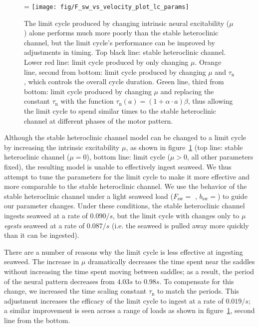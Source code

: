 \begin{figure}
    \ifthesis
        \linewidth
    \else
        \figwidth=\linewidth
    \fi
    \centering
    \texttt{[image: fig/F\_sw\_vs\_velocity\_plot\_lc\_params]}
    \caption[Timing dependence of the limit cycle]{
    The limit cycle produced by changing intrinsic neural excitability ($\mu$)
    alone performs much
    more poorly than the stable heteroclinic channel, but the limit cycle's
    performance can be improved by adjustments in timing.  Top black line: stable
    heteroclinic channel.  Lower red line: limit cycle produced by only changing
    $\mu$.  Orange line, second from bottom: limit cycle produced by changing
    $\mu$ and $\tau_\textrm{n}$, which controls the overall cycle duration.
    Green line, third from bottom: limit cycle produced
    by changing $\mu$ and replacing the constant $\tau_\textrm{n}$ with the function
    $\tau_\textrm{n}(a) = (1 + \alpha \cdot a) \beta$, thus allowing the limit
    cycle to spend similar times to the stable heteroclinic channel at different
    phases of the motor pattern.}
    \label{fig:F_sw_vs_velocity_plot_lc_params}
\end{figure}

Although the stable heteroclinic channel model can be changed to a limit cycle
by increasing the intrinsic excitability $\mu$, as shown in
figure~\ref{fig:F_sw_vs_velocity_plot_lc_params} (top line: stable heteroclinic
channel ($\mu = 0$), bottom line: limit cycle ($\mu > 0$, all other parameters fixed), the resulting model
is unable to effectively ingest seaweed.  We thus attempt to tune the
parameters for the limit cycle to make it more effective and more comparable
to the stable heteroclinic channel.  We use the behavior of the stable
heteroclinic channel under a light seaweed load ($F_\textrm{sw} =$%
\paramValFsw, $b_\textrm{sw} =$\paramValbsw) to guide our parameter changes.
Under these conditions, the stable heteroclinic channel ingests seaweed at a
rate of $0.090/s$, but the limit cycle with changes only to $\mu$
\emph{egests} seaweed at a rate of $0.087/s$ (i.e. the seaweed is pulled away
more quickly than it can be ingested).

There are a number of reasons why the limit cycle is less effective at ingesting
seaweed.  The increase in $\mu$ dramatically decreases the time spent near the
saddles without increasing the time spent moving between saddles; as a result,
the period of the neural pattern decreases from $4.03 s$ to $0.98 s$.  To
compensate for this change, we increased the time scaling constant $\tau_\textrm{n}$
to match the periods.  This adjustment increases the efficacy of the limit
cycle to ingest at a rate of $0.019/s$; a similar improvement is seen across
a range of loads as shown in
figure~\ref{fig:F_sw_vs_velocity_plot_lc_params}, second line from the
bottom.

